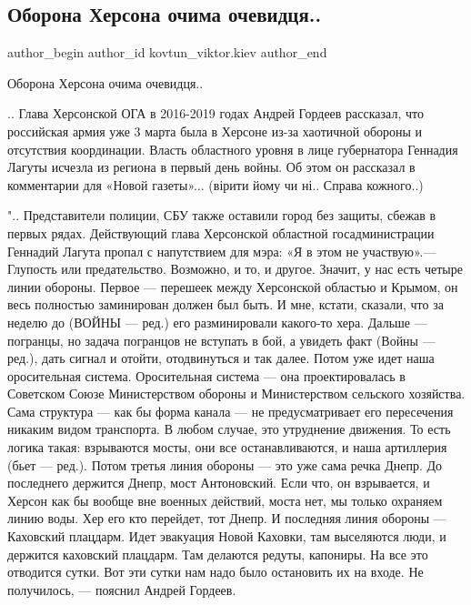  
 
 
 
 
 
\subsection{Оборона Херсона очима очевидця..}
\label{sec:25_04_2022.fb.kovtun_viktor.kiev.1.oborona_hersona}
 
\ifcmt
 author_begin
   author_id kovtun_viktor.kiev
 author_end
\fi

Оборона Херсона очима очевидця.. 

.. Глава Херсонской ОГА в 2016-2019 годах Андрей Гордеев рассказал, что
российская армия уже 3 марта была в Херсоне из-за хаотичной обороны и
отсутствия координации. Власть областного уровня в лице губернатора Геннадия
Лагуты исчезла из региона в первый день войны. Об этом он рассказал в
комментарии для «Новой газеты»... (вірити йому чи ні.. Справа кожного..) 


".. Представители полиции, СБУ также оставили город без защиты, сбежав в первых
рядах. Действующий глава Херсонской областной госадминистрации Геннадий Лагута
пропал с напутствием для мэра: «Я в этом не участвую».— Глупость или
предательство. Возможно, и то, и другое. Значит, у нас есть четыре линии
обороны. Первое — перешеек между Херсонской областью и Крымом, он весь
полностью заминирован должен был быть. И мне, кстати, сказали, что за неделю до
(ВОЙНЫ — ред.) его разминировали какого-то хера. Дальше — погранцы, но задача
погранцов не вступать в бой, а увидеть факт (Войны — ред.), дать сигнал и
отойти, отодвинуться и так далее. Потом уже идет наша оросительная система.
Оросительная система — она проектировалась в Советском Союзе Министерством
обороны и Министерством сельского хозяйства. Сама структура — как бы форма
канала — не предусматривает его пересечения никаким видом транспорта. В любом
случае, это утруднение движения. То есть логика такая: взрываются мосты, они
все останавливаются, и наша артиллерия (бьет — ред.). Потом третья линия
обороны — это уже сама речка Днепр. До последнего держится Днепр, мост
Антоновский. Если что, он взрывается, и Херсон как бы вообще вне военных
действий, моста нет, мы только охраняем линию воды. Хер его кто перейдет, тот
Днепр. И последняя линия обороны — Каховский плацдарм. Идет эвакуация Новой
Каховки, там выселяются люди, и держится каховский плацдарм. Там делаются
редуты, капониры. На все это отводится сутки. Вот эти сутки нам надо было
остановить их на входе. Не получилось, — пояснил Андрей Гордеев.

